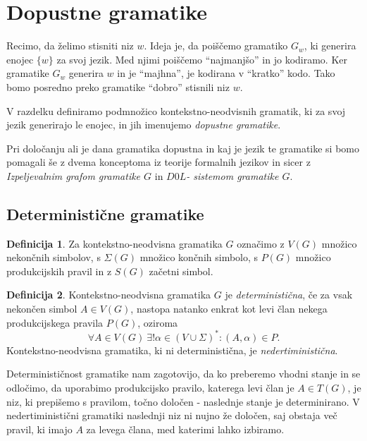 \documentclass{amsart}
\theoremstyle{definition}
\newtheorem{definicija}{Definicija}[section]
\theoremstyle{plain} %
\begin{document}
\section{Dopustne gramatike}

Recimo, da želimo stisniti niz $ w $. Ideja je, da poiščemo gramatiko $ G_w $, ki generira
enojec $ \{ w \} $ za svoj jezik. Med njimi poiščemo ``najmanjšo'' in jo kodiramo.
Ker gramatike $ G_w $ generira $ w $ in je ``majhna'', je kodirana v ``kratko'' kodo.
Tako bomo posredno preko gramatike ``dobro'' stisnili niz $ w $.

V razdelku definiramo podmnožico kontekstno-neodvisnih gramatik, ki za svoj jezik generirajo le
enojec, in jih imenujemo \textit{dopustne gramatike}.

Pri določanju ali je dana gramatika dopustna in kaj je jezik te gramatike si bomo pomagali še z dvema konceptoma iz
teorije formalnih jezikov in sicer z \textit{Izpeljevalnim grafom gramatike $ G $ } in \textit{$ D0L $- sistemom gramatike $ G $}.


\subsection*{Deterministične gramatike}

\begin{definicija}
    
    Za kontekstno-neodvisna gramatika $ G $ označimo z $ V(G) $ množico nekončnih simbolov, s $ \Sigma(G) $
    množico končnih simbolo, s $ P(G) $ množico produkcijskih pravil in z $ S(G) $ začetni simbol.

\end{definicija}

\begin{definicija}
    
    Kontekstno-neodvisna gramatika $ G $ je \textit{deterministična}, če za vsak nekončen simbol $ A \in V(G) $,
    nastopa natanko enkrat kot levi član nekega produkcijskega pravila $ P(G) $, oziroma
    \[
        \forall A \in V(G) \ \exists! \alpha \in ( V \cup \Sigma )^*  \colon (A,\alpha) \in P.
    \]
    Kontekstno-neodvisna gramatika, ki ni deterministična, je \textit{nedertiministična}.

\end{definicija}

Determinističnost gramatike nam zagotovijo, da ko preberemo vhodni stanje in se odločimo, da uporabimo produkcijsko 
pravilo, katerega levi član je $ A \in T(G) $, je niz, ki prepišemo s pravilom, točno določen - naslednje stanje je determinirano.
V nedertiministični gramatiki naslednji niz ni nujno že določen, saj obstaja več pravil, ki imajo $ A $ za levega člana, med 
katerimi lahko izbiramo.
\end{document}
